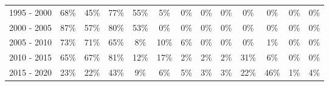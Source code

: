 \begin{table}[ht!]
{\begin{tabular}{r|cccc|cccc|cccc}
            1995 - 2000           & \cellcolor[HTML]{FFC550}68\% & \cellcolor[HTML]{FFD88B}45\%     & \cellcolor[HTML]{FFBD39}77\%  & \cellcolor[HTML]{FFD072}55\% & \cellcolor[HTML]{FFFBF2}5\%  & 0\%                         & 0\%                         & 0\%                         & 0\%                          & 0\%                          & 0\%                         & 0\%                         \\
            2000 - 2005           & \cellcolor[HTML]{FFB520}87\% & \cellcolor[HTML]{FFCE6D}57\%     & \cellcolor[HTML]{FFBB32}80\%  & \cellcolor[HTML]{FFBB32}53\% & 0\%                          & 0\%                         & 0\%                         & 0\%                         & 0\%                          & 0\%                          & 0\%                         & 0\%                         \\
            2005 - 2010           & \cellcolor[HTML]{FFC144}73\% & \cellcolor[HTML]{FFC249}71\%     & \cellcolor[HTML]{FFC758}65\%  & \cellcolor[HTML]{FFC249}8\%  & \cellcolor[HTML]{FFF6E5}10\% & \cellcolor[HTML]{FFFAF0}6\% & 0\%                         & 0\%                         & 0\%                          & \cellcolor[HTML]{FFFEFC}1\%  & 0\%                         & 0\%                         \\
            2010 - 2015           & \cellcolor[HTML]{FFC758}65\% & \cellcolor[HTML]{FFC653}67\%     & \cellcolor[HTML]{FFBA2F}81\%  & \cellcolor[HTML]{FFF5E0}12\% & \cellcolor[HTML]{FFF5E0}17\% & \cellcolor[HTML]{FFFDFA}2\% & \cellcolor[HTML]{FFFDFA}2\% & \cellcolor[HTML]{FFFDFA}2\% & \cellcolor[HTML]{FFE4AF}31\% & \cellcolor[HTML]{FFFAF0}6\%  & 0\%                         & 0\%                         \\
            2015 - 2020           & \cellcolor[HTML]{FFEBC4}23\% & \cellcolor[HTML]{FFECC7}22\%     & \cellcolor[HTML]{FFDA91}43\%  & \cellcolor[HTML]{FFF7E8}9\%  & \cellcolor[HTML]{FFFAF0}6\%  & \cellcolor[HTML]{FFFBF2}5\% & \cellcolor[HTML]{FFFBF2}3\% & \cellcolor[HTML]{FFFBF2}3\% & \cellcolor[HTML]{FFECC7}22\% & \cellcolor[HTML]{FFD889}46\% & \cellcolor[HTML]{FFFEFC}1\% & \cellcolor[HTML]{FFFCF5}4\% \\ \hline
        \end{tabular}%
    }
\end{table}